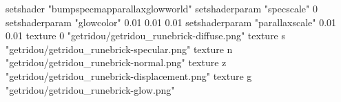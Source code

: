 setshader "bumpspecmapparallaxglowworld"
setshaderparam "specscale" 0
setshaderparam "glowcolor" 0.01 0.01 0.01
setshaderparam "parallaxscale" 0.01 0.01
texture 0 "getridou/getridou_runebrick-diffuse.png"
texture s "getridou/getridou_runebrick-specular.png"
texture n "getridou/getridou_runebrick-normal.png"
texture z "getridou/getridou_runebrick-displacement.png"
texture g "getridou/getridou_runebrick-glow.png"
